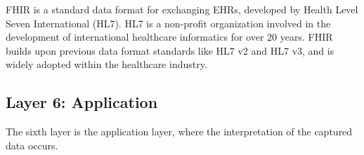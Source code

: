 \acf{FHIR} is a standard data format for exchanging \acs{EHR}s, developed by Health Level Seven International (HL7). HL7 is a non-profit organization involved in the development of international healthcare informatics for over 20 years. \acs{FHIR} builds upon previous data format standards like HL7 v2 and HL7 v3, and is widely adopted within the healthcare industry. 

\subsection{Layer 6: Application}
\label{sec:iot-model-layer6}



The sixth layer is the application layer, where the interpretation of the captured data occurs. 



